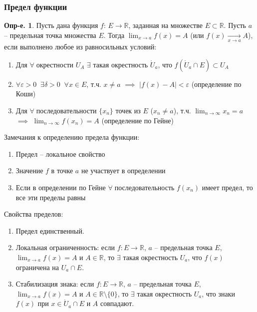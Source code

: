 \documentclass[a4paper,12pt]{article}
\numberwithin{figure}{section}
\theoremstyle{definition}
\newtheorem{definition}{Опр-е.}[section]
\theoremstyle{definition}
\def\.{\;\;}
\def\DS{\displaystyle}
\def\eps{\varepsilon}
\def\ntoinf{n \to \infty}
\def\ringU{\mathring{U}}
\def\mathR{\mathbb{R}}
\def\on{\!:}
\def\any {$\forall\;$}
\begin{document}
\subsubsection{Предел функции}

\begin{definition}
	Пусть дана функция $f$: $E\to\mathR$, заданная на множестве $E \subset \mathR$.
	Пусть $a$ -- предельная точка множества $E$.
	Тогда $\DS \lim_{x \to a}f(x)=A$ (или $f(x) \xrightarrow[x \to a]{} A$),
	если выполнено любое из равносильных условий:
	\begin{enumerate}
		\item Для \any окрестности $U_A$ $\exists$ такая окрестность $\ringU_a$,
			  что $f(\ringU_a \cap E) \subset U_A$
		\item $\forall \eps>0 \. \exists \delta>0 \. \forall x \in E$,
			  т.ч. $x \ne a$ $\implies$ $\left|f(x)-A\right|<\eps$
			  (определение по Коши)
		\item Для \any последовательности $\{x_n\}$ точек из $E$ ($x_n\ne a$),
			  т.ч. $\DS \lim_{\ntoinf}x_n = a$
			  $\implies$ $\DS \lim_{\ntoinf}f(x_n) = A$
			  (определение по Гейне)
	\end{enumerate}
\end{definition}

\bigbreak
Замечания к определению предела функции: \begin{enumerate}
	\item Предел -- локальное свойство
	\item Значение $f$ в точке $a$ не участвует в определении
	\item Если в определении по Гейне \any последовательность $f(x_n)$ имеет предел,
  		  то все эти пределы равны
\end{enumerate}

\bigbreak
Свойства пределов: \begin{enumerate}
	\item Предел единственный.
	\item Локальная ограниченность: если $f\on E\to\mathR$, $a$ -- предельная точка $E$,
  		  $\DS \lim_{x\to a}f(x)=A$ и $A \in \mathR$,
  		  то $\exists$ такая окрестность $U_a$, что $f(x)$ ограничена на $U_a \cap E$.
	\item Стабилизация знака: если $f\on E\to\mathR$, $a$ -- предельная точка $E$,
		  $\DS \lim_{x\to a}f(x)=A$ и $A \in \mathR \setminus \{0\}$,
  		  то $\exists$ такая окрестность $U_a$,
  		  что знаки $f(x)$ при $x \in \ringU_a \cap E$ и $A$ совпадают.
\end{enumerate}
\end{document}
